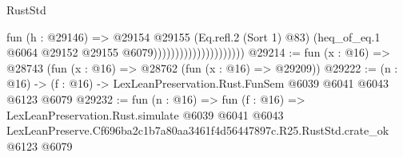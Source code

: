 \begin{lexlean}{RustStd}
\begin{coremodule}
                                          fun (h : @29146) =>
                                          @29154
                                            @29155
                                            (Eq.refl.{2} (Sort 1) @83)
                                            (heq_of_eq.{1}
                                              @6064
                                              @29152
                                              @29155
                                              @6079)))))))))))))))))))))
@29214 := fun (x : @16) => @28743 (fun (x : @16) => @28762 (fun (x : @16) => @29209))
@29222 := (n : @16) -> (f : @16) -> LexLeanPreservation.Rust.FunSem @6039 @6041 @6043 @6123 @6079
@29232 := fun (n : @16) =>
  fun (f : @16) =>
  LexLeanPreservation.Rust.simulate
    @6039
    @6041
    @6043
    LexLeanPreserve.Cf696ba2c1b7a80aa3461f4d56447897c.R25.RustStd.crate_ok
    @6123
    @6079
\end{coremodule}
\end{lexlean}
